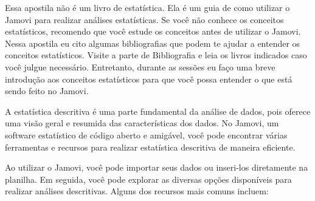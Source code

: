 \begin{tcolorbox}[colback=white,colframe=green,title= Dica de Conteúdo]
    Essa apostila não é um livro de estatística. Ela é um guia de como utilizar o Jamovi para realizar análises estatísticas. Se você não conhece os conceitos estatísticos, recomendo que você estude os conceitos antes de utilizar o Jamovi. Nessa apostila eu cito algumas bibliografias que podem te ajudar a entender os conceitos estatísticos. Visite a parte de Bibliografia e leia os livros indicados caso você julgue necessário. Entretanto, durante as sessões eu faço uma breve introdução aos conceitos estatísticos para que você possa entender o que está sendo feito no Jamovi.
\end{tcolorbox}

A estatística descritiva é uma parte fundamental da análise de dados, pois oferece uma visão geral e resumida das características dos dados. No Jamovi, um software estatístico de código aberto e amigável, você pode encontrar várias ferramentas e recursos para realizar estatística descritiva de maneira eficiente.

Ao utilizar o Jamovi, você pode importar seus dados ou inseri-los diretamente na planilha. Em seguida, você pode explorar as diversas opções disponíveis para realizar análises descritivas. Alguns dos recursos mais comuns incluem:

